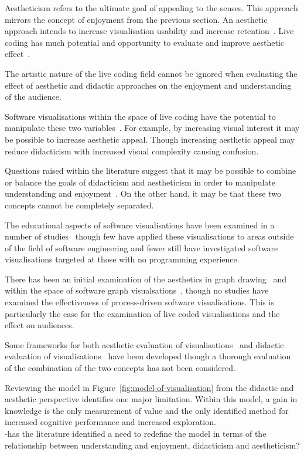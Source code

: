 Aestheticism refers to the ultimate goal of appealing to the senses. This approach mirrors the concept of enjoyment from the previous section. An aesthetic approach intends to increase visualisation usability and increase retention~\cite{Cawthon2007}. Live coding has much potential and opportunity to evaluate and improve aesthetic effect~\cite{Bell}.

The artistic nature of the live coding field cannot be ignored when evaluating the effect of aesthetic and didactic approaches on the enjoyment and understanding of the audience.

Software visualisations within the space of live coding have the potential to manipulate these two variables~\cite{Iru,McLean2010a}. For example, by increasing visual interest it may be possible to increase aesthetic appeal. Though increasing aesthetic appeal may reduce didacticism with increased visual complexity causing confusion.

Questions raised within the literature suggest that it may be possible to combine or balance the goals of didacticism and aestheticism in order to manipulate understanding and enjoyment~. On the other hand, it may be that these two concepts cannot be completely separated.

The educational aspects of software visualisations have been examined in a number of studies~ though few have applied these visualisations to areas outside of the field of software engineering and fewer still have investigated software visualisations targeted at those with no programming experience.

There has been an initial examination of the aesthetics in graph drawing~ and within the space of software graph visualsations~, though no studies have examined the effectiveness of process-driven software visualisations. This is particularly the case for the examination of live coded visualisations and the effect on audiences.

Some frameworks for both aesthetic evaluation of visualisations~\cite{Cawthon2007,Purchase1996} and didactic evaluation of visualisations~\cite{VanWijk2005} have been developed though a thorough evaluation of the combination of the two concepts has not been considered.

Reviewing the model in Figure~\ref{fig:model-of-visualisation} from the didactic and aesthetic perspective identifies one major limitation. Within this model, a gain in knowledge is the only measurement of value and the only identified method for increased cognitive performance and increased exploration.\\
-has the literature identified a need to redefine the model in terms of the relationship between understanding and enjoyment, didacticism and aestheticism?


